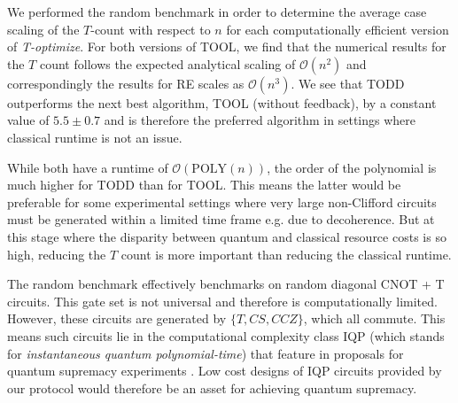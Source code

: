 \documentclass[notitlepage]{article}
\theoremstyle{definition}
\theoremstyle{problem}
\theoremstyle{lemma}
\begin{document}
	We performed the random benchmark in order to determine the average case scaling of the $T$-count with respect to $n$ for each computationally efficient version of \emph{T-optimize}. 		For both versions of TOOL, we find that the numerical results for the $T$ count follows the expected analytical scaling of $\mathcal{O}(n^2)$ and correspondingly the results for RE scales as $\mathcal{O}(n^3)$.
	We see that TODD outperforms the next best algorithm, TOOL (without feedback), by a constant value of $5.5\pm0.7$ and is therefore the preferred algorithm in settings where classical runtime is not an issue.

	While both have a runtime of $\mathcal{O}(\mathrm{POLY}(n))$, the order of the polynomial is much higher for TODD than for TOOL. This means the latter would be preferable for some experimental settings where very large non-Clifford circuits must be generated within a limited time frame e.g. due to decoherence. But at this stage where the disparity between quantum and classical resource costs is so high, reducing the $T$ count is more important than reducing the classical runtime.
 	
	The random benchmark effectively benchmarks on random diagonal CNOT + T circuits. This gate set is not universal and therefore is computationally limited. However, these circuits are generated by $\{T, CS, CCZ\}$, which all commute. This means such circuits lie in the computational complexity class IQP (which stands for \emph{instantaneous quantum  polynomial-time}) that feature in proposals for quantum supremacy experiments \cite{2_Bremner_2010,monty,Shepherd1413}.  Low cost designs of IQP circuits provided by our protocol would therefore be an asset for achieving quantum supremacy.
	
	
	
	
	
	
	
\end{document}
